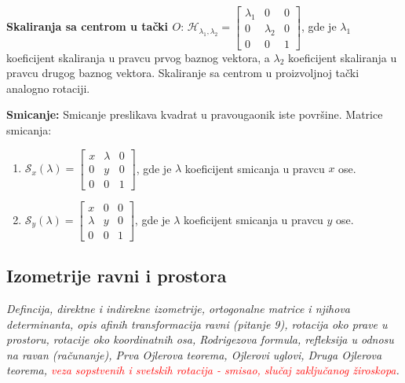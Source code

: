\documentclass[12pt]{article}
\newcommand{\ocena}[1]{\textcolor{red}{#1}}
\begin{document}
\textbf{Skaliranja sa centrom u tački $O$}:
$\mathcal{H}_{\lambda_1,\lambda_2}=\begin{bmatrix}
        \lambda_1 & 0         & 0 \\
        0         & \lambda_2 & 0 \\
        0         & 0         & 1
    \end{bmatrix}$, gde je $\lambda_1$ koeficijent skaliranja u pravcu
prvog baznog vektora, a $\lambda_2$ koeficijent skaliranja u pravcu
drugog baznog vektora. Skaliranje sa centrom u proizvoljnoj tački analogno
rotaciji.
\par

\textbf{Smicanje:} Smicanje preslikava kvadrat u pravougaonik iste površine.
Matrice smicanja:
\begin{enumerate}[label=]
    \item $\mathcal{S}_x(\lambda)=\begin{bmatrix}
                  x & \lambda & 0 \\
                  0 & y       & 0 \\
                  0 & 0       & 1
              \end{bmatrix}$, gde je $\lambda$ koeficijent smicanja u pravcu $x$ ose.
    \item $\mathcal{S}_y(\lambda)=\begin{bmatrix}
                  x       & 0 & 0 \\
                  \lambda & y & 0 \\
                  0       & 0 & 1
              \end{bmatrix}$, gde je $\lambda$ koeficijent smicanja u pravcu $y$ ose.
\end{enumerate}

\subsection{Izometrije ravni i prostora}
\textit{Defincija, direktne i indirekne izometrije, ortogonalne matrice i
    njihova determinanta, opis afinih transformacija ravni (pitanje 9), rotacija
    oko prave u prostoru, rotacije oko koordinatnih osa, Rodrigezova formula,
    refleksija u odnosu na ravan (računanje), Prva Ojlerova teorema, Ojlerovi
    uglovi, Druga Ojlerova teorema, \ocena{veza sopstvenih i svetskih rotacija - smisao,
        slučaj zaključanog žiroskopa}.}
\par
\vspace*{1cm}
\end{document}

